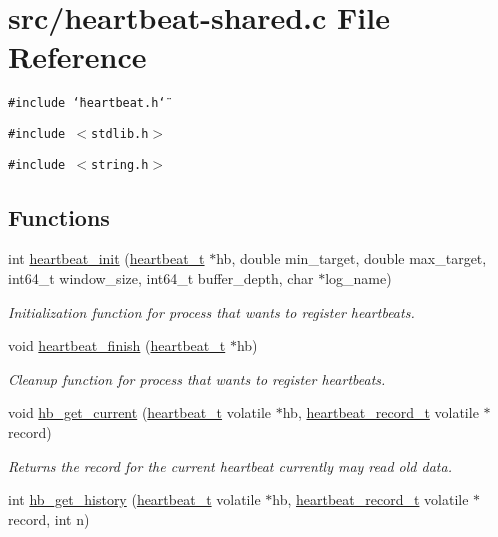 \hypertarget{heartbeat-shared_8c}{
\section{src/heartbeat-shared.c File Reference}
\label{heartbeat-shared_8c}
}
{\tt \#include \char`\"{}heartbeat.h\char`\"{}}\par
{\tt \#include $<$stdlib.h$>$}\par
{\tt \#include $<$string.h$>$}\par
\subsection*{Functions}
\begin{CompactItemize}
\item 
int \hyperlink{heartbeat-shared_8c_b0215f451a25327778cf2469bbf17808}{heartbeat\_\-init} (\hyperlink{structheartbeat__t}{heartbeat\_\-t} $\ast$hb, double min\_\-target, double max\_\-target, int64\_\-t window\_\-size, int64\_\-t buffer\_\-depth, char $\ast$log\_\-name)
\begin{CompactList}\small\item\em Initialization function for process that wants to register heartbeats. \item\end{CompactList}\item 
void \hyperlink{heartbeat-shared_8c_472683cf2037492695c74b37944efca9}{heartbeat\_\-finish} (\hyperlink{structheartbeat__t}{heartbeat\_\-t} $\ast$hb)
\begin{CompactList}\small\item\em Cleanup function for process that wants to register heartbeats. \item\end{CompactList}\item 
void \hyperlink{heartbeat-shared_8c_75042acfdcb08a614964eab511fe6299}{hb\_\-get\_\-current} (\hyperlink{structheartbeat__t}{heartbeat\_\-t} volatile $\ast$hb, \hyperlink{structheartbeat__record__t}{heartbeat\_\-record\_\-t} volatile $\ast$record)
\begin{CompactList}\small\item\em Returns the record for the current heartbeat currently may read old data. \item\end{CompactList}\item 
int \hyperlink{heartbeat-shared_8c_d75f7029162a84476c6e7411f59f86f2}{hb\_\-get\_\-history} (\hyperlink{structheartbeat__t}{heartbeat\_\-t} volatile $\ast$hb, \hyperlink{structheartbeat__record__t}{heartbeat\_\-record\_\-t} volatile $\ast$record, int n)

\end{CompactItemize}
